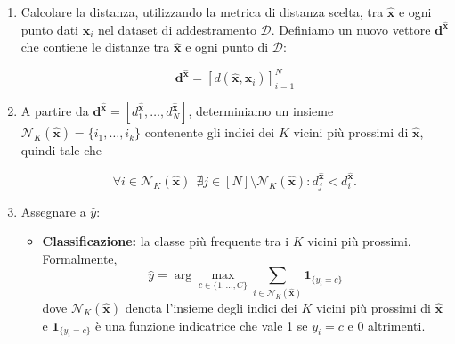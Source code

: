 \begin{enumerate}
    \item Calcolare la distanza, utilizzando la metrica di distanza scelta, tra \( \hat{\mathbf{x}} \) e 
    ogni punto dati \( \mathbf{x}_i \) nel dataset 
    di addestramento \( \mathcal{D} \). Definiamo un nuovo vettore $\mathbf d^{\hat{\mathbf x}}$ che contiene le distanze 
    tra \( \hat{\mathbf{x}} \) e ogni punto di \(\mathcal{D}\):

    $$
    \mathbf d^{\hat{\mathbf x}} = [d(\hat{\mathbf{x}}, \mathbf{x}_i)]^N_{i=1}
    $$

    \item A partire da $\mathbf d^{\hat{\mathbf x}} = [d^{\hat{\mathbf x}}_1, \ldots, d^{\hat{\mathbf x}}_N]$, 
    determiniamo un insieme $\mathcal{N}_K(\hat{\mathbf{x}}) = \{i_1, \ldots, i_k\}$ contenente gli indici
    dei \( K \) vicini più prossimi di \( \hat{\mathbf{x}} \), quindi tale che
    
    $$
    \forall i \in \mathcal{N}_K(\hat{\mathbf{x}}) \ \ \nexists j \in [N] \setminus \mathcal{N}_K(\hat{\mathbf{x}}) : d^{\hat{\mathbf x}}_j < d^{\hat{\mathbf x}}_i.
    $$

%
%
%

    \item Assegnare a \( \hat{y} \):
    
    \begin{itemize}
        
        \item \textbf{Classificazione:} la classe più frequente tra i \( K \) vicini più prossimi. Formalmente,
        \[
    \hat{y} = \arg\max_{c \in \{1, \ldots, C\}} \sum_{i \in \mathcal{N}_K(\hat{\mathbf{x}})} \mathbf{1}_{\{y_i = c\}}
    \]
    dove \( \mathcal{N}_K(\hat{\mathbf{x}}) \) denota l'insieme degli indici dei \( K \) vicini più prossimi 
    di \( \hat{\mathbf{x}} \) e \( \mathbf{1}_{\{y_i = c\}} \) è una funzione indicatrice che vale 1 se \( y_i = c \) e 0 altrimenti.
    


\end{itemize}
\end{enumerate}
